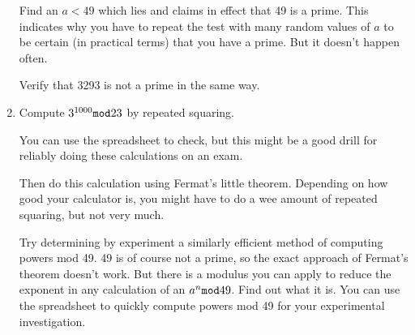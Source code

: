 \documentclass[12pt]{article}
\begin{document}
\begin{enumerate}
Find an $a<49$ which lies and claims in effect that 49 is a prime.  This indicates why you have to repeat the test
with many random values of $a$ to be certain (in practical terms) that you have a prime.  But it doesn't happen often.

Verify that 3293 is not a prime in the same way.

\item  Compute $3^{1000}{\tt mod}23$ by repeated squaring.

You can use the spreadsheet to check, but this might be a good drill for reliably doing these calculations on an exam.

Then do this calculation using Fermat's little theorem.  Depending on how good your calculator is, you might have to do a wee amount of repeated squaring, but not very much.

Try determining by experiment a similarly efficient method of computing powers mod 49.  49 is of course not a prime,
so the exact approach of Fermat's theorem doesn't work.  But there is a modulus you can apply to reduce the exponent in any calculation of an $a^n {\tt mod} 49$.  Find out what it is.  You can use the spreadsheet to quickly compute powers mod 49 for your experimental investigation.



\end{enumerate}
\end{document}
